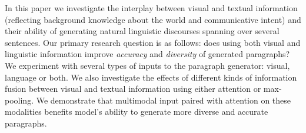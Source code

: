 \documentclass[11pt,a4paper]{article}
\begin{document}

In this paper we investigate the interplay between visual and textual information (reflecting background knowledge about the world and communicative intent) and their ability of generating natural linguistic discourses spanning over several sentences.
Our primary research question is as follows: does %
using both visual and linguistic information improve \emph{accuracy} and \emph{diversity} of generated paragraphs?
We experiment with several types of inputs to the paragraph generator: visual, language or both.
We also investigate the effects of different kinds of information fusion between visual and textual information using either attention or max-pooling. %
We demonstrate that multimodal input paired with attention on these modalities benefits model's ability to generate more diverse and accurate paragraphs. %
\end{document}
